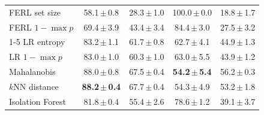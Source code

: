 \begin{table}[t]
\begin{tabular}{@{}lcccc@{}}
FERL set size & 58.1\,$\pm$\,0.8 & 28.3\,$\pm$\,1.0 & 100.0\,$\pm$\,0.0 & 18.8\,$\pm$\,1.7\\
FERL $1-\max p$ & 69.4\,$\pm$\,3.9 & 43.4\,$\pm$\,3.4 & 84.4\,$\pm$\,3.0 & 27.5\,$\pm$\,3.2\\
\cmidrule(l){1-5}
LR entropy & 83.2\,$\pm$\,1.1 & 61.7\,$\pm$\,0.8 & 62.7\,$\pm$\,4.1 & 44.9\,$\pm$\,1.3\\
LR $1-\max p$ & 83.0\,$\pm$\,1.0 & 60.3\,$\pm$\,1.0 & 63.0\,$\pm$\,5.5 & 43.9\,$\pm$\,1.2\\
Mahalanobis & 88.0\,$\pm$\,0.8 & 67.5\,$\pm$\,0.4 & \textbf{54.2\,$\pm$\,5.4} & 56.2\,$\pm$\,0.3\\
$k$NN distance & \textbf{88.2\,$\pm$\,0.4} & 67.7\,$\pm$\,0.4 & 54.3\,$\pm$\,4.9 & 53.2\,$\pm$\,1.8\\
Isolation Forest & 81.8\,$\pm$\,0.4 & 55.4\,$\pm$\,2.6 & 78.6\,$\pm$\,1.2 & 39.1\,$\pm$\,3.7\\
\bottomrule
\end{tabular}
\end{table}
